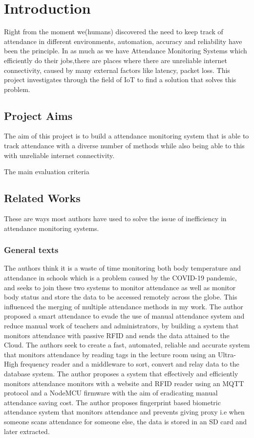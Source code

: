 \chapter{Introduction}
Right from the moment we(humans) discovered the need to keep track of attendance in different environments, automation, accuracy and reliability have been the principle. In as much as we have Attendance Monitoring Systems which efficiently do their jobs,there are places where there are unreliable internet connectivity, caused by many external factors like latency, packet loss. This project investigates through the field of IoT to find a solution that solves this problem.


\section{Project Aims}

The aim of this project is to build a attendance monitoring system that is able to track attendance with a diverse number of methods while also being able to this with unreliable internet connectivity. 

The main evaluation criteria


\section{Related Works} 
These are ways most authors have used to solve the issue of inefficiency in attendance monitoring systems.
\subsection{General texts}
The authors think it is a waste of time monitoring both body temperature and attendance in schools which is a problem caused by the COVID-19 pandemic, and seeks to join these two systems to monitor attendance as well as monitor body status and store the data to be accessed remotely across the globe. This influenced the merging of multiple attendance methods in my work.
The author proposed a smart attendance to evade the use of manual attendance system and reduce manual work of teachers and administrators, by building a system that monitors attendance with passive RFID and sends the data attained to the Cloud.
The authors seek to create a fast, automated, reliable and accurate system that monitors attendance by reading tags in the lecture room using an Ultra-High frequency reader and a middleware to sort, convert and relay data to the database system. 
The author proposes a system that effectively and efficiently monitors attendance monitors with a website and RFID reader using an MQTT protocol and a NodeMCU firmware with the aim of eradicating manual attendance saving cost.
The author proposes fingerprint based biometric attendance system that monitors attendance and prevents giving proxy i.e when someone scans attendance for someone else, the data is stored in an SD card and later extracted. 

